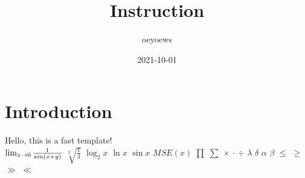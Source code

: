 \documentclass{article}
\title{Instruction}
\author{oeyoews}
\date{2021-10-01}
\begin{document}
\maketitle

\section{Introduction}
Hello, this is a fast template!\\
$
\lim_{x \to 0} \frac 1 {sin (x+y)}\\
$
$\sqrt[2] {\frac 1 3} $
$\log_2 x$
$\ln x$
$\sin x$
$MSE(x)$
$\prod$
$\sum$
$\times$
$\cdot$
$\div$
$\lambda$
$\delta$
$\alpha$
$\beta$
$\le$
$\ge$
$\gg$
$\ll$
\end{document}

